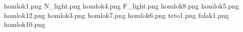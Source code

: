 homlok1.png
N_light.png
homlok4.png
F_light.png
homlok8.png
homlok5.png
homlok12.png
homlok3.png
homlok7.png
homlok6.png
teto1.png
falak1.png
homlok10.png
